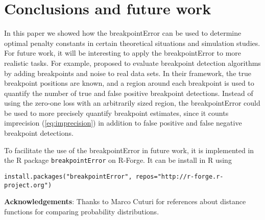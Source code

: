 \documentclass{jsfds} %
\begin{document}
\section{Conclusions and future work}

In this paper we showed how the breakpointError can be used to
determine optimal penalty constants in certain theoretical situations
and simulation studies. For future work, it will be interesting to
apply the breakpointError to more realistic tasks. For example,
\citet{perf-eval-framework} proposed to evaluate breakpoint detection
algorithms by adding breakpoints and noise to real data sets. In their
framework, the true breakpoint positions are known, and a region
around each breakpoint is used to quantify the number of true and
false positive breakpoint detections. Instead of using the zero-one
loss with an arbitrarily sized region, the breakpointError could be
used to more precisely quantify breakpoint estimates, since it counts
imprecision (\ref{eq:imprecision}) in addition to false positive and
false negative breakpoint detections.

To facilitate the use of the breakpointError in future work, it is
implemented in the R package \verb|breakpointError| on R-Forge. It can
be install in R using

\begin{verbatim}
install.packages("breakpointError", repos="http://r-forge.r-project.org")
\end{verbatim}

\textbf{Acknowledgements}: Thanks to Marco Cuturi for references about
distance functions for comparing probability distributions.

%

\end{document}
